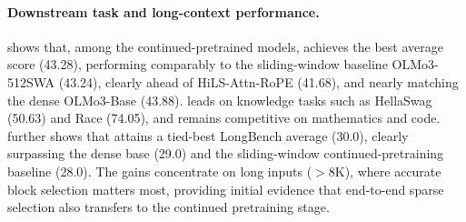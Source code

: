 \begin{table}[!t]
    \centering
    \caption{
        Evaluation results on LongBench for OLMo3-7B continued pretraining.
    }
    \label{tab:cpt_longbench}
\end{table}



\paragraph{Downstream task and long-context performance.}
 shows that, among the continued-pretrained models, \our achieves the best average score (43.28), performing comparably to the sliding-window baseline OLMo3-512SWA (43.24), clearly ahead of HiLS-Attn-RoPE (41.68), and nearly matching the dense OLMo3-Base (43.88).
\our leads on knowledge tasks such as HellaSwag (50.63) and Race (74.05), and remains competitive on mathematics and code.
 further shows that \our attains a tied-best LongBench average (30.0), clearly surpassing the dense base (29.0) and the sliding-window continued-pretraining baseline (28.0).
The gains concentrate on long inputs ($>$8K), where accurate block selection matters most, providing initial evidence that end-to-end sparse selection also transfers to the continued pretraining stage.



